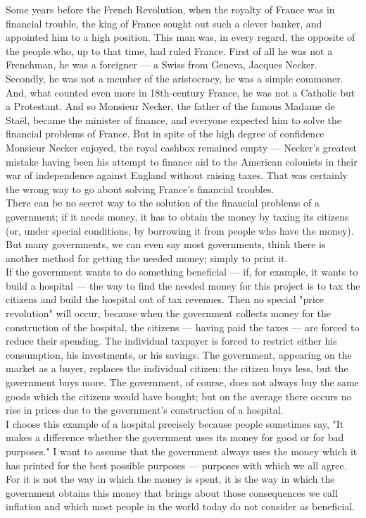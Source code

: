 \documentclass[a4paper]{article}
\begin{document}
Some years before the French Revolution, when the royalty of France was in 
financial trouble, the king of France sought out such a clever banker, and 
appointed him to a high position. This man was, in every regard, the opposite 
of the people who, up to that time, had ruled France. First of all he was not a
Frenchman, he was a foreigner — a Swiss from Geneva, Jacques Necker. Secondly, 
he was not a member of the aristocracy, he was a simple commoner. And, what 
counted even more in 18th-century France, he was not a Catholic but a 
Protestant. And so Monsieur Necker, the father of the famous Madame de Staël, 
became the minister of finance, and everyone expected him to solve the 
financial problems of France. But in spite of the high degree of confidence 
Monsieur Necker enjoyed, the royal cashbox remained empty — Necker's greatest 
mistake having been his attempt to finance aid to the American colonists in 
their war of independence against England without raising taxes. That was 
certainly the wrong way to go about solving France's financial troubles.\\

There can be no secret way to the solution of the financial problems of a 
government; if it needs money, it has to obtain the money by taxing its 
citizens (or, under special conditions, by borrowing it from people who have 
the money). But many governments, we can even say most governments, think there
is another method for getting the needed money; simply to print it.\\

If the government wants to do something beneficial — if, for example, it wants 
to build a hospital — the way to find the needed money for this project is to 
tax the citizens and build the hospital out of tax revenues. Then no special 
"price revolution" will occur, because when the government collects money for 
the construction of the hospital, the citizens — having paid the taxes — are 
forced to reduce their spending. The individual taxpayer is forced to restrict 
either his consumption, his investments, or his savings. The government, 
appearing on the market as a buyer, replaces the individual citizen: the 
citizen buys less, but the government buys more. The government, of course, 
does not always buy the same goods which the citizens would have bought; but on
the average there occurs no rise in prices due to the government's construction
of a hospital.\\

I choose this example of a hospital precisely because people sometimes say, "It
makes a difference whether the government uses its money for good or for bad 
purposes." I want to assume that the government always uses the money which it 
has printed for the best possible purposes — purposes with which we all agree. 
For it is not the way in which the money is spent, it is the way in which the 
government obtains this money that brings about those consequences we call 
inflation and which most people in the world today do not consider as 
beneficial.\\
\end{document}
